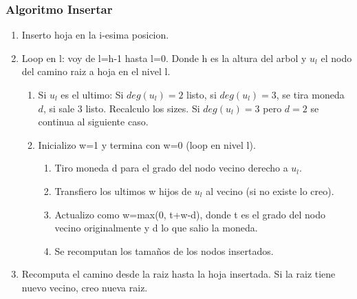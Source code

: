 \documentclass[10pt,handout]{beamer}
\begin{document}
\begin{frame}
\frametitle{Algoritmo Insertar}
 \begin{enumerate}\itemsep-1em
  \item Inserto hoja en la i-esima posicion.
  \item Loop en l: voy de l=h-1 hasta l=0.
    Donde h es la altura del arbol y $u_l$ el nodo del camino raiz a hoja en el nivel l.
    \vspace{-0.4cm}
    \begin{enumerate}[a]\itemsep-1em
    \item Si $u_l$ es el ultimo: Si $deg(u_l)=2$ listo, si $deg(u_l)=3$, se tira moneda $d$, si sale 3 listo. Recalculo los sizes.
      Si $deg(u_l)=3$ pero $d=2$ se continua al siguiente caso.
    \item Inicializo w=1 y termina con w=0 (loop en nivel l).
          \vspace{-0.4cm}
      \begin{enumerate}[i]\itemsep-1em
        \item Tiro moneda d para el grado del nodo vecino derecho a $u_l$.
        \item Transfiero los ultimos w hijos de $u_l$ al vecino (si no existe lo creo).
        \item Actualizo como w=max(0, t+w-d), donde t es el grado del nodo vecino originalmente y d lo que salio la moneda.
         \item Se recomputan los tama\~nos de los nodos insertados.
      \end{enumerate}
  \end{enumerate}
  \item  Recomputa el camino desde la raiz hasta la hoja insertada.
  Si la raiz tiene nuevo vecino, creo nueva raiz.
\end{enumerate}

\end{frame}

\end{document}

